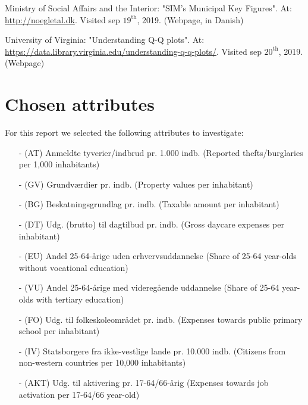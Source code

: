\documentclass[11pt,fleqn]{article}
\numberwithin{footnote}{section}
\numberwithin{figure}{section}
\numberwithin{table}{section}
\begin{document}
\clearpage


\begin{thebibliography}{9}
	\item Ministry of Social Affairs and the Interior: "SIM's Municipal Key Figures". At: \url{http://noegletal.dk}. Visited sep $19^{\text{th}}$, 2019. (Webpage, in Danish)
	\item University of Virginia: "Understanding Q-Q plots". At: \url{https://data.library.virginia.edu/understanding-q-q-plots/}. Visited sep $20^{\text {th}}$, 2019. (Webpage)
\end{thebibliography}

\appendix
\section{Chosen attributes}\label{app:attrs}
For this report we selected the following attributes to investigate:
\begin{itemize}
	\item[-] (AT) Anmeldte tyverier/indbrud pr. 1.000 indb. (Reported thefts/burglaries per 1,000 inhabitants)
	\item[-] (GV) Grundværdier pr. indb. (Property values per inhabitant)
	\item[-] (BG) Beskatningsgrundlag pr. indb. (Taxable amount per inhabitant)
	\item[-] (DT) Udg. (brutto) til dagtilbud pr. indb. (Gross daycare expenses per inhabitant)
	\item[-] (EU) Andel 25-64-årige uden erhvervsuddannelse (Share of 25-64 year-olds without vocational education)
	\item[-] (VU) Andel 25-64-årige med videregående uddannelse (Share of 25-64 year-olds with tertiary education)
	\item[-] (FO) Udg. til folkeskoleområdet pr. indb. (Expenses towards public primary school per inhabitant)
	\item[-] (IV) Statsborgere fra ikke-vestlige lande pr. 10.000 indb. (Citizens from non-western countries per 10,000 inhabitants)
	\item[-] (AKT) Udg. til aktivering pr. 17-64/66-årig (Expenses towards job activation per 17-64/66 year-old)
\end{itemize}
\end{document}
